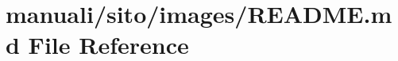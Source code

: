 \hypertarget{manuali_2sito_2images_2README_8md}{}\section{manuali/sito/images/\+R\+E\+A\+D\+ME.md File Reference}
\label{manuali_2sito_2images_2README_8md}
